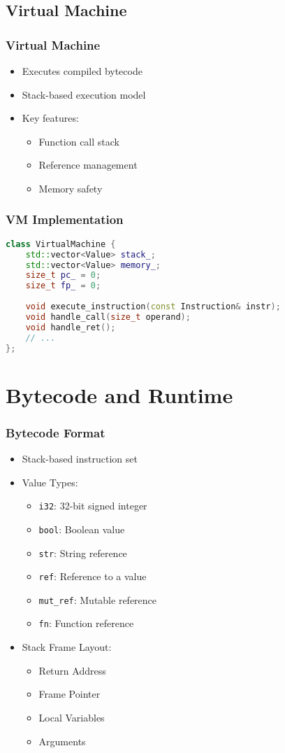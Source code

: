 \documentclass{beamer}
\begin{document}
\subsection{Virtual Machine}
\begin{frame}
\frametitle{Virtual Machine}
\begin{itemize}
    \item Executes compiled bytecode
    \item Stack-based execution model
    \item Key features:
    \begin{itemize}
        \item Function call stack
        \item Reference management
        \item Memory safety
    \end{itemize}
\end{itemize}
\end{frame}

\begin{frame}[fragile]
\frametitle{VM Implementation}
\begin{lstlisting}[language=C++]
class VirtualMachine {
    std::vector<Value> stack_;
    std::vector<Value> memory_;
    size_t pc_ = 0;
    size_t fp_ = 0;
    
    void execute_instruction(const Instruction& instr);
    void handle_call(size_t operand);
    void handle_ret();
    // ...
};
\end{lstlisting}
\end{frame}

\section{Bytecode and Runtime}
\begin{frame}
\frametitle{Bytecode Format}
\begin{itemize}
    \item Stack-based instruction set
    \item Value Types:
    \begin{itemize}
        \item \texttt{i32}: 32-bit signed integer
        \item \texttt{bool}: Boolean value
        \item \texttt{str}: String reference
        \item \texttt{ref}: Reference to a value
        \item \texttt{mut\_ref}: Mutable reference
        \item \texttt{fn}: Function reference
    \end{itemize}
    \item Stack Frame Layout:
    \begin{itemize}
        \item Return Address
        \item Frame Pointer
        \item Local Variables
        \item Arguments
    \end{itemize}
\end{itemize}
\end{frame}
\end{document}
